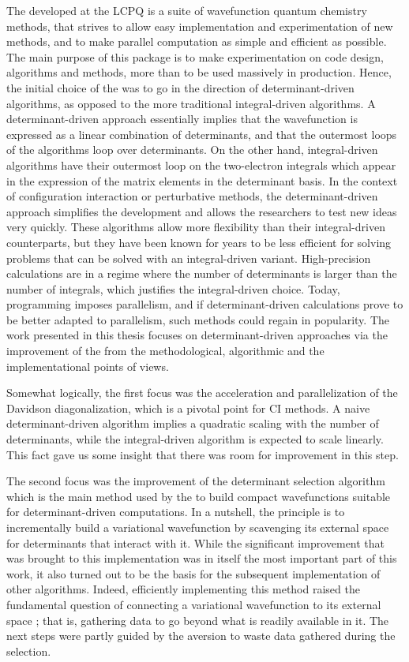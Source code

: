 \documentclass[12pt,a4paper]{report}
\begin{document}
The \QP\cite{QP} developed at the LCPQ is a suite of wavefunction quantum
chemistry methods, that strives to allow easy implementation and
experimentation of new methods, and to make parallel computation
as simple and efficient as possible. The main purpose of this package
is to make experimentation on code design, algorithms and methods,
more than to be used massively in production.
Hence, the initial choice of the \QP was to go in the direction of
determinant-driven algorithms, as opposed to the more traditional
integral-driven algorithms.
A determinant-driven approach essentially implies that the wavefunction
is expressed as a linear combination of determinants, and that the 
outermost loops of the algorithms loop over determinants.
On the other hand, integral-driven algorithms have their outermost loop
on the two-electron integrals which appear in the expression of the matrix
elements in the determinant basis.
In the context of configuration interaction or perturbative
methods, the determinant-driven approach simplifies the development and allows
the researchers to test new ideas very quickly. These algorithms allow more
flexibility than their integral-driven
counterparts,\cite{Povill_1995} but they have been known for years to
be less efficient for solving problems that can be solved with an
integral-driven variant. High-precision calculations are in a regime
where the number of determinants is larger than the number of integrals,
which justifies the integral-driven choice.  Today, programming imposes
parallelism, and if
determinant-driven calculations prove to be better adapted to parallelism, such
methods could regain in popularity. The work presented in this thesis focuses
on determinant-driven approaches via the improvement of the \QP from
the methodological, algorithmic and the implementational points of views.


Somewhat logically, the first focus was the acceleration and parallelization of the
Davidson diagonalization, which is a pivotal point for CI methods.
A naive determinant-driven algorithm implies a quadratic scaling with the
number of determinants, while the integral-driven algorithm is expected to
scale linearly. This fact gave us some insight that there was room for
improvement in this step. 

The second focus was the improvement of the determinant selection algorithm
which is the main method used by the \QP to build compact wavefunctions
suitable for determinant-driven computations. In a nutshell, the principle is
to incrementally build a variational wavefunction by scavenging its external
space for determinants that interact with it. While the significant
improvement that was brought to this implementation was in itself the most
important part of this work, it also turned out to be the basis for the subsequent
implementation of other algorithms. Indeed, efficiently implementing this
method raised the fundamental question of connecting a variational wavefunction
to its external space ; that is, gathering data to go beyond what is readily
available in it. The next steps were partly guided by the aversion to waste
data gathered during the selection.
\end{document}
